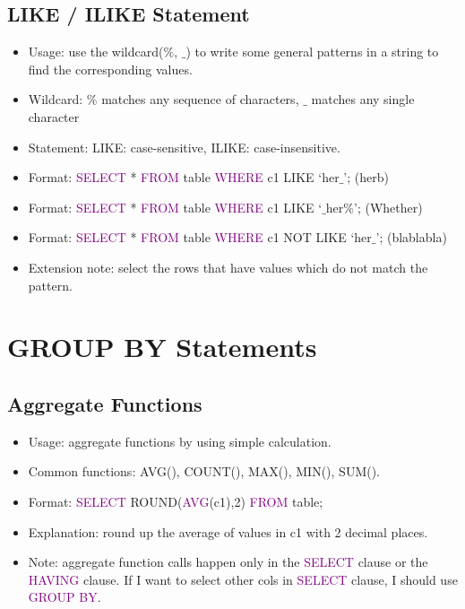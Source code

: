 \documentclass[a4paper]{article}
\begin{document}
\subsection{LIKE / ILIKE Statement}
\begin{itemize}
  \item Usage: use the wildcard($\%$, $\_$) to write some general patterns in a string to find the corresponding values.
  \item Wildcard: $\%$ matches any sequence of characters, $\_$ matches any single character
  \item Statement: LIKE: case-sensitive, ILIKE: case-insensitive.
  \item Format: \textcolor{purple}{SELECT} * \textcolor{purple}{FROM} table \textcolor{purple}{WHERE} c1 LIKE `her$\_$'; (herb)
  \item Format: \textcolor{purple}{SELECT} * \textcolor{purple}{FROM} table \textcolor{purple}{WHERE} c1 LIKE `$\_$her$\%$'; (Whether)  
  \item Format: \textcolor{purple}{SELECT} * \textcolor{purple}{FROM} table \textcolor{purple}{WHERE} c1 NOT LIKE `her$\_$'; (blablabla)
  \item Extension note: select the rows that have values which do not match the pattern.
\end{itemize}

\section{GROUP BY Statements}

\subsection{Aggregate Functions}
\begin{itemize}
  \item Usage: aggregate functions by using simple calculation.
  \item Common functions: AVG(), COUNT(), MAX(), MIN(), SUM().
  \item Format: \textcolor{purple}{SELECT} ROUND(\textcolor{purple}{AVG}(c1),2) \textcolor{purple}{FROM} table;
  \item Explanation: round up the average of values in c1 with 2 decimal places.
  \item Note: aggregate function calls happen only in the \textcolor{purple}{SELECT} clause or the \textcolor{purple}{HAVING} clause. If I want to select other cols in \textcolor{purple}{SELECT} clause, I should use \textcolor{purple}{GROUP BY}.
\end{itemize}
\end{document}
